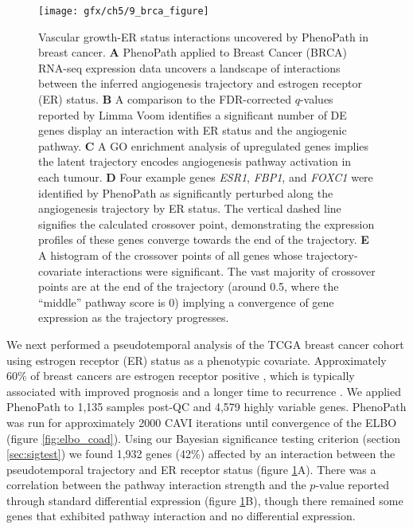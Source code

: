 \begin{figure}
\texttt{[image: gfx/ch5/9\_brca\_figure]}
\caption{Vascular growth-ER status interactions uncovered by PhenoPath in breast cancer.
\textbf{A} PhenoPath applied to Breast Cancer (BRCA) RNA-seq expression data uncovers a landscape of interactions between the inferred angiogenesis trajectory and estrogen receptor (ER) status.
\textbf{B} A comparison to the FDR-corrected $q$-values reported by Limma Voom identifies a significant number of DE genes display an interaction with ER status and the angiogenic pathway.
\textbf{C} A GO enrichment analysis of upregulated genes implies the latent trajectory encodes angiogenesis pathway activation in each tumour.
\textbf{D} Four example genes \emph{ESR1}, \emph{FBP1}, and \emph{FOXC1} were identified by PhenoPath as significantly perturbed along the angiogenesis trajectory by ER status. The vertical dashed line signifies the calculated crossover point, demonstrating the expression profiles of these genes converge towards the end of the trajectory.
\textbf{E} A histogram of the crossover points of all genes whose trajectory-covariate interactions were significant. The vast majority of crossover points are at the end of the trajectory (around 0.5, where the ``middle'' pathway score is 0) implying a convergence of gene expression as the trajectory progresses.
} \label{fig:brca_er}
\end{figure}


We next performed a pseudotemporal analysis of the TCGA breast cancer cohort using estrogen receptor (ER) status as a phenotypic covariate. Approximately 60\% of breast cancers are estrogen receptor positive
\cite{Early_Breast_Cancer_Trialists_Collaborative_Group_EBCTCG_undated-ux}, which is typically associated with improved prognosis and a longer time to recurrence 
\cite{Parl1984-fo}. We applied PhenoPath to 1,135 samples post-QC and 4,579 highly variable genes. PhenoPath was run for approximately 2000 CAVI iterations until convergence of the ELBO (figure \ref{fig:elbo_coad}). Using our Bayesian significance testing criterion (section \ref{sec:sigtest}) we found 1,932 genes (42\%) affected by an interaction between the pseudotemporal trajectory and ER receptor status (figure \ref{fig:brca_er}A).
 There was a correlation between the pathway interaction strength and the $p$-value reported through standard differential expression (figure \ref{fig:brca_er}B), though there remained some genes that exhibited pathway interaction and no differential expression.

